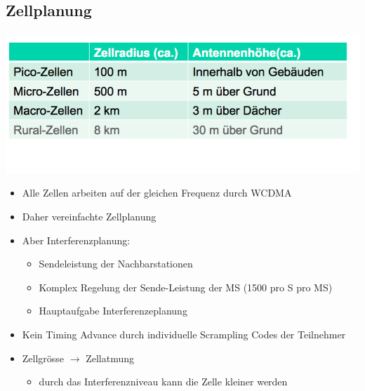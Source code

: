 \subsection{Zellplanung}
\begin{minipage}{0.3\linewidth}
\includegraphics[width = \linewidth]{./Pics/UMTSZell}
\end{minipage}
\begin{minipage}{0.7\linewidth}
\begin{itemize}
\item Alle Zellen arbeiten auf der gleichen Frequenz durch WCDMA
\item Daher vereinfachte Zellplanung
\item Aber Interferenzplanung:
\begin{itemize}
\item Sendeleistung der Nachbarstationen
\item Komplex Regelung der Sende-Leistung der MS (1500 pro S pro MS)
\item Hauptaufgabe Interferenzeplanung
\end{itemize}
\item Kein Timing Advance durch individuelle Scrampling Codes der Teilnehmer
\item Zellgrösse $\rightarrow$ Zellatmung
\begin{itemize}
\item durch das Interferenzniveau kann die Zelle kleiner werden
\end{itemize}
\end{itemize}
\end{minipage}